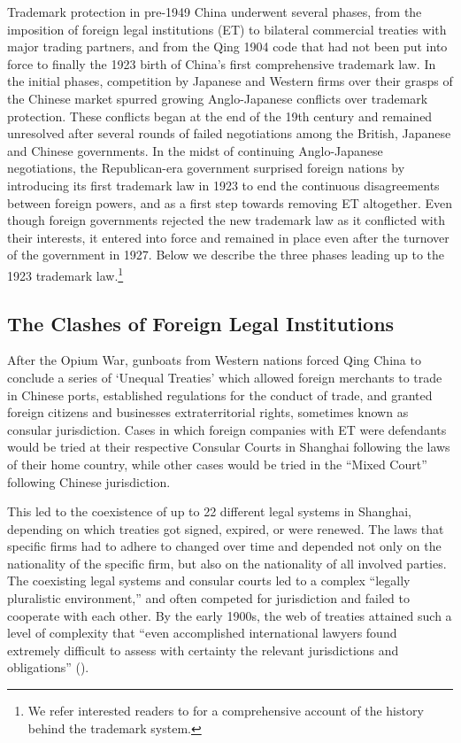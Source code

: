 \documentclass[12pt]{article}
\begin{document}
Trademark protection in pre-1949 China underwent several phases, from the imposition of foreign legal institutions (ET) to bilateral commercial treaties with major trading partners, and from the Qing 1904 code that had not been put into force to finally the 1923 birth of China's first comprehensive trademark law. In the initial phases, competition by Japanese and Western firms over their grasps of the Chinese market spurred growing Anglo-Japanese conflicts over trademark protection. These conflicts began at the end of the 19th century and remained unresolved after several rounds of failed negotiations among the British, Japanese and Chinese governments. In the midst of continuing Anglo-Japanese negotiations, the Republican-era government surprised foreign nations by introducing its first trademark law in 1923 to end the continuous disagreements between foreign powers, and as a first step towards removing ET altogether. Even though foreign governments rejected the new trademark law as it conflicted with their interests, it entered into force and remained in place even after the turnover of the government in 1927. Below we describe the three phases leading up to the 1923 trademark law.\footnote{We refer interested readers to \citet{Motono2011, Motono2013} for a comprehensive account of the history behind the trademark system.}

\subsection{The Clashes of Foreign Legal Institutions}

After the Opium War, gunboats from Western nations forced Qing China to conclude a series of `Unequal Treaties' which allowed foreign merchants to trade in Chinese ports, established regulations for the conduct of trade, and granted foreign citizens and businesses extraterritorial rights, sometimes known as consular jurisdiction. Cases in which foreign companies with ET were defendants would be tried at their respective Consular Courts in Shanghai following the laws of their home country, while other cases would be tried in the ``Mixed Court'' following Chinese jurisdiction.

This led to the coexistence of up to 22 different legal systems in Shanghai, depending on which treaties got signed, expired, or were renewed. The laws that specific firms had to adhere to changed over time and depended not only on the nationality of the specific firm, but also on the nationality of all involved parties. The coexisting legal systems and consular courts led to a complex ``legally pluralistic environment,'' and often competed for jurisdiction and failed to cooperate with each other. By the early 1900s, the web of treaties attained such a level of complexity that ``even accomplished international lawyers found extremely difficult to assess with certainty the relevant jurisdictions and obligations'' (\citealp{Cassel2012}). 
\end{document}
